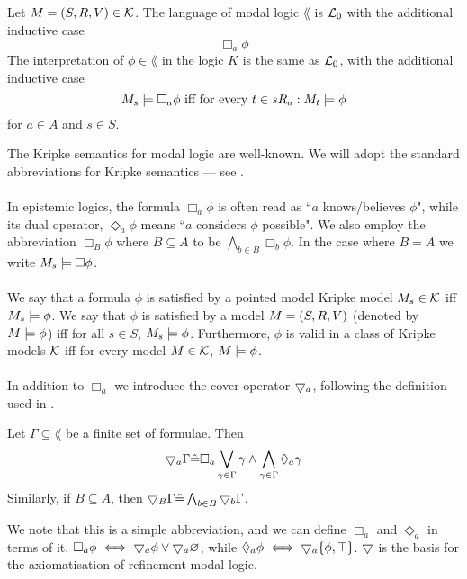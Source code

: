 \begin{defn} \label{modalLogic}
Let $M = (S, R, V) \in \mathcal{K}$.
The language of modal logic $\lang$ is $\mathcal{L}_0$ with the additional inductive case
\[
	 \Box_a \phi
\]
The interpretation of $\phi \in \lang$ in the logic $K$ is the same as $\mathcal{L}_0$, with the
additional inductive case
\[
	M_s \models \Box_a \phi \text{ iff for every }t \in s R_a: M_t \models \phi
\]
for $a \in A$ and $s \in S$.
\end{defn}
The Kripke semantics for modal logic are well-known.
We will adopt the standard abbreviations for Kripke semantics --- see \cite{blackburn2002modal}.\\
\\
In epistemic logics, the formula $\Box_a \phi$ is often read as ``$a$ knows/believes $\phi$", while
its dual operator, $\Diamond_a \phi$ means ``$a$ considers $\phi$ possible".
We also employ the abbreviation $\Box_B \phi$ where $B \subseteq A$ to be $\bigwedge_{b \in B}
\Box_b \phi$.
In the case where $B = A$ we write $M_s \models \Box \phi$.\\
\\
We say that a formula $\phi$ is satisfied by a pointed model Kripke model $M_s \in \mathcal{K}$ iff
$M_s \models \phi$.
We say that $\phi$ is satisfied by a model $M = (S, R, V)$ (denoted by
    $M \models \phi$) iff
for all $s \in S$, $M_s \models \phi$.
Furthermore, $\phi$ is valid in a class of Kripke models $\mathcal{K}$ iff for
every model $M \in
\mathcal{K}$, $M \models \phi$.\\
\\
In addition to $\Box_a$ we introduce the cover operator $\bigtriangledown_a$, following the definition used in
\cite{venemaproofsystems}.
\begin{defn} \label{coverDef}
Let $\Gamma \subseteq \lang$ be a finite set of formulae.
Then
\[
  \bigtriangledown_a \Gamma \hat{=} \Box_a \bigvee_{\gamma \in \Gamma} \gamma \land
  \bigwedge_{\gamma \in \Gamma} \Diamond_a \gamma
\]
Similarly, if $B \subseteq A$, then $\bigtriangledown_B \Gamma \hat{=} \bigwedge_{b \in B}
\bigtriangledown_b \Gamma$.
\end{defn}
We note that this is a simple abbreviation, and we can define $\Box_a$ and
$\Diamond_a$ in terms of it.
$\Box_a \phi \iff \bigtriangledown_a \phi \lor \bigtriangledown_a \varnothing$, while $\Diamond_a
\phi \iff \bigtriangledown_a \{\phi, \top\}$.
$\bigtriangledown$ is the basis for the axiomatisation of refinement modal logic.\\
\\
